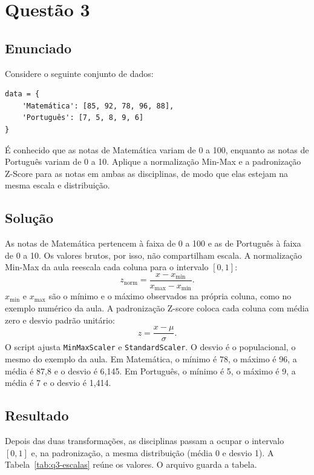 \section{Questão 3}

\subsection{Enunciado}

Considere o seguinte conjunto de dados:
\begin{verbatim}
data = {
    'Matemática': [85, 92, 78, 96, 88],
    'Português': [7, 5, 8, 9, 6]
}
\end{verbatim}
É conhecido que as notas de Matemática variam de 0 a 100, enquanto as notas de Português variam de 0 a 10. Aplique a normalização Min-Max e a padronização Z-Score para as notas em ambas as disciplinas, de modo que elas estejam na mesma escala e distribuição.

\subsection{Solução}

As notas de Matemática pertencem à faixa de 0 a 100 e as de Português à faixa de 0 a 10. Os valores brutos, por isso, não compartilham escala. A normalização Min-Max da aula reescala cada coluna para o intervalo \([0, 1]\):
\[
z_{\mathrm{norm}} = \frac{x - x_{\min}}{x_{\max} - x_{\min}}.
\]
\(x_{\min}\) e \(x_{\max}\) são o mínimo e o máximo observados na própria coluna, como no exemplo numérico da aula. A padronização Z-score coloca cada coluna com média zero e desvio padrão unitário:
\[
z = \frac{x - \mu}{\sigma}.
\]
O script ajusta \texttt{MinMaxScaler} e \texttt{StandardScaler}. O desvio é o populacional, o mesmo do exemplo da aula. Em Matemática, o mínimo é 78, o máximo é 96, a média é 87,8 e o desvio é 6,145. Em Português, o mínimo é 5, o máximo é 9, a média é 7 e o desvio é 1,414.

\subsection{Resultado}

Depois das duas transformações, as disciplinas passam a ocupar o intervalo \([0, 1]\) e, na padronização, a mesma distribuição (média 0 e desvio 1). A Tabela~\ref{tab:q3-escalas} reúne os valores. O arquivo  guarda a tabela.

